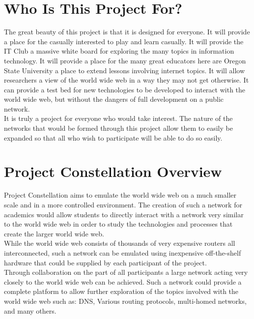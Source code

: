 \documentclass[12pt]{article}
\begin{document}
\section{Who Is This Project For?}

The great beauty of this project is that it is designed for everyone. It will provide a place for the casually interested to play
and learn casually. It will provide the IT Club a massive white board for exploring the many topics in information technology. It will
provide a place for the many great educators here are Oregon State University a place to extend lessons involving internet topics. It
will allow researchers a view of the world wide web in a way they may not get otherwise. It can provide a test bed for new technologies
to be developed to interact with the world wide web, but without the dangers of full development on a public network.
\\

It is truly a project for everyone who would take interest. The nature of the networks that would be formed through this project 
allow them to easily be expanded so that all who wish to participate will be able to do so easily. 

\section{Project Constellation Overview}

Project Constellation aims to emulate the world wide web on a much smaller scale and in a more controlled
environment. The creation of such a network for academics would allow students to directly interact with a 
network very similar to the world wide web in order to study the technologies and processes that create the
larger world wide web.
\\

While the world wide web consists of thousands of very expensive routers all interconnected, such a network
can be emulated using inexpensive off-the-shelf hardware that could be supplied by each participant of the
project.
\\

Through collaboration on the part of all participants a large network acting very closely to the world wide 
web can be achieved. Such a network could provide a complete platform to allow further exploration of the topics
involved with the world wide web such as: DNS, Various routing protocols, multi-homed networks, and many others.
\end{document}
